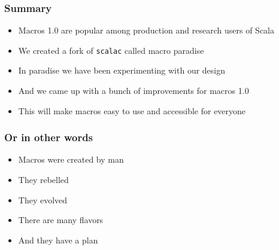 \documentclass[svgnames,hyperref={bookmarks=false}]{beamer}
\begin{document}
\begin{frame}[fragile]
\frametitle{}

\vskip40pt
\begin{center}
\end{center}
\end{frame}

\begin{frame}[fragile]
\frametitle{Summary}

\begin{itemize}
\item Macros 1.0 are popular among production and research users of Scala
\item We created a fork of \texttt{scalac} called macro paradise
\item In paradise we have been experimenting with our design
\item And we came up with a bunch of improvements for macros 1.0
\item This will make macros easy to use and accessible for everyone
\end{itemize}
\end{frame}

\begin{frame}[fragile]
\frametitle{Or in other words}

\begin{itemize}
\item Macros were created by man
\item They rebelled
\item They evolved
\item There are many flavors
\item And they have a plan
\end{itemize}
\end{frame}
\end{document}
